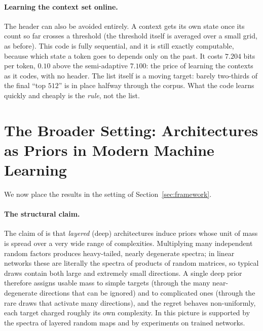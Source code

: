 \documentclass[11pt]{article}
\begin{document}
\paragraph{Learning the context set online.}
The header can also be avoided entirely.  A context gets its own state
once its count so far crosses a threshold (the threshold itself is
averaged over a small grid, as before).  This code is fully sequential,
and it is still exactly computable, because which state a token goes to
depends only on the past.  It costs \(7.204\) bits per token, \(0.10\)
above the semi-adaptive \(7.100\): the price of learning the contexts as
it codes, with no header.  The list itself is a moving target: barely
two-thirds of the final ``top \(512\)'' is in place halfway through the
corpus.  What the code learns quickly and cheaply is the \emph{rule},
not the list.

\section{The Broader Setting: Architectures as Priors in Modern
Machine Learning}
\label{sec:broader}
We now place the results in the setting of Section~\ref{sec:framework}.


\paragraph{The structural claim.}
The claim of \cite{feder2025framework} is that \emph{layered} (deep)
architectures induce priors whose unit of mass is spread over a very wide
range of complexities.  Multiplying many independent random factors
produces heavy-tailed, nearly degenerate spectra; in linear networks these
are literally the spectra of products of random matrices, so typical draws
contain both large and extremely small directions.  A single deep prior
therefore assigns usable mass to simple targets (through the many
near-degenerate directions that can be ignored) and to complicated ones
(through the rare draws that activate many directions), and the regret
behaves non-uniformly, each target charged roughly its own complexity.  In
\cite{feder2025framework} this picture is supported by the spectra of
layered random maps and by experiments on trained networks.
\end{document}
